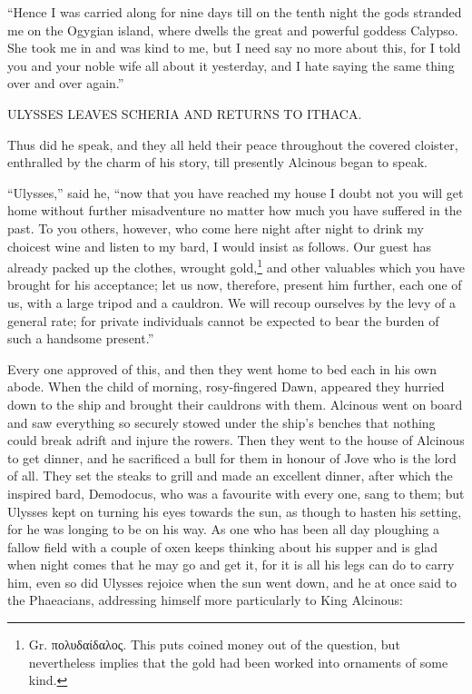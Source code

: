 “Hence I was carried along for nine days till on the tenth night the gods
stranded me on the Ogygian island, where dwells the great and powerful goddess
Calypso. She took me in and was kind to me, but I need say no more about this,
for I told you and your noble wife all about it yesterday, and I hate saying
the same thing over and over again.”


ULYSSES LEAVES SCHERIA AND RETURNS TO ITHACA.

Thus did he speak, and they all held their peace throughout the covered
cloister, enthralled by the charm of his story, till presently Alcinous began
to speak.

“Ulysses,” said he, “now that you have reached my house I doubt not you will
get home without further misadventure no matter how much you have suffered in
the past. To you others, however, who come here night after night to drink my
choicest wine and listen to my bard, I would insist as follows. Our guest has
already packed up the clothes, wrought gold,\footnote{Gr.
πολυδαίδαλος.
This puts coined money out of the question, but nevertheless implies that the
gold had been worked into ornaments of some kind.} and other valuables which you have
brought for his acceptance; let us now, therefore, present him further, each
one of us, with a large tripod and a cauldron. We will recoup ourselves by the
levy of a general rate; for private individuals cannot be expected to bear the
burden of such a handsome present.”

Every one approved of this, and then they went home to bed each in his own
abode. When the child of morning, rosy-fingered Dawn, appeared they hurried
down to the ship and brought their cauldrons with them. Alcinous went on board
and saw everything so securely stowed under the ship’s benches that nothing
could break adrift and injure the rowers. Then they went to the house of
Alcinous to get dinner, and he sacrificed a bull for them in honour of Jove who
is the lord of all. They set the steaks to grill and made an excellent dinner,
after which the inspired bard, Demodocus, who was a favourite with every one,
sang to them; but Ulysses kept on turning his eyes towards the sun, as though
to hasten his setting, for he was longing to be on his way. As one who has been
all day ploughing a fallow field with a couple of oxen keeps thinking about his
supper and is glad when night comes that he may go and get it, for it is all
his legs can do to carry him, even so did Ulysses rejoice when the sun went
down, and he at once said to the Phaeacians, addressing himself more
particularly to King Alcinous:

